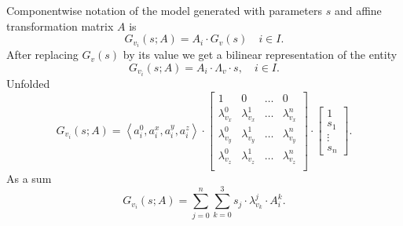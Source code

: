 Componentwise notation of the model
generated with parameters $s$ and affine transformation matrix $A$
is
\begin{equation*}
  G_{v_i}\left( s; A \right)
  = A_i \cdot G_v\left( s \right)
  \quad i \in I.
\end{equation*}
After replacing $G_v\left( s \right)$ by its value we get
a bilinear representation of the entity
\begin{equation*}
  G_{v_i}\left( s; A \right)
  = A_i \cdot \Lambda_v \cdot s,
  \quad i \in I.
\end{equation*}
Unfolded
\begin{equation*}
  G_{v_i}\left( s; A \right)
  = \left\langle a^0_i, a_i^x, a_i^y, a_i^z \right\rangle
    \cdot \begin{bmatrix}
      1               & 0               & \dots & 0 \\
      \lambda^0_{v_x} & \lambda^1_{v_x} & \dots & \lambda^n_{v_x} \\
      \lambda^0_{v_y} & \lambda^1_{v_y} & \dots & \lambda^n_{v_y} \\
      \lambda^0_{v_z} & \lambda^1_{v_z} & \dots & \lambda^n_{v_z} \\
    \end{bmatrix}
    \cdot \begin{bmatrix}
      1 \\
      s_1 \\
      \vdots \\
      s_n
    \end{bmatrix}.
\end{equation*}
As a sum
\begin{equation*}
  G_{v_i}\left( s; A \right)
  = \sum\limits_{j = 0}^{n} \sum\limits_{k = 0}^{3}
    s_{j} \cdot \lambda^{j}_{v_k} \cdot A_i^{k}.
\end{equation*}
